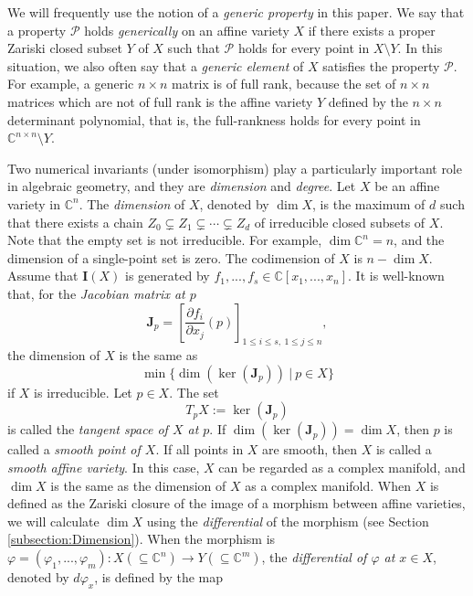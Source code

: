 \documentclass[reqno]{amsart}
\theoremstyle{definition}
\numberwithin{equation}{section}
\begin{document}
We will frequently use the notion of a \emph{generic property} in this paper. We say that a property $\mathcal{P}$ holds \emph{generically} on an affine variety $X$ if there exists a proper Zariski closed subset $Y$ of $X$ such that $\mathcal{P}$ holds for every point in $X \setminus Y$. In this situation, we also often say that a \emph{generic element} of $X$ satisfies the property $\mathcal{P}$. For example, a generic $n \times n$ matrix is of full rank, because the set of $n \times n$ matrices which are not of full rank is the affine variety $Y$ defined by the $n \times n$ determinant polynomial, that is, the full-rankness holds for every point in $\mathbb{C}^{n \times n} \setminus Y$.

Two numerical invariants (under isomorphism) play a particularly important role in algebraic geometry, and they are \emph{dimension} and \emph{degree}. Let $X$ be an affine variety in $\mathbb{C}^n$. The \emph{dimension} of $X$, denoted by $\dim X$, is the maximum of $d$ such that there exists a chain $Z_0 \subsetneq Z_1 \subsetneq \cdots \subsetneq Z_d$ of irreducible closed subsets of $X$. Note that the empty set is not irreducible. For example, $\dim \mathbb{C}^n=n$, and the dimension of a single-point set is zero. The codimension of $X$ is $n-\dim X$. Assume that $\mathbf{I}(X)$ is generated by $f_1,...,f_s \in \mathbb{C}[x_1,...,x_n]$. It is well-known that, for the \emph{Jacobian matrix at $p$}
\begin{equation*}
    \mathbf{J}_p=\left[\frac{\partial f_i}{\partial x_j}(p)\right]_{1 \leq i \leq s,~ 1 \leq j \leq n},
\end{equation*}
the dimension of $X$ is the same as
\begin{equation*}
    \min\{\dim(\ker(\mathbf{J}_p))~|~p \in X\}
\end{equation*}
if $X$ is irreducible. Let $p \in X$. The set
\begin{equation*}
    T_pX:=\ker(\mathbf{J}_p)
\end{equation*}
is called the \emph{tangent space of $X$ at $p$}. If $\dim (\ker(\mathbf{J}_p))=\dim X$, then $p$ is called a \emph{smooth point of $X$}. If all points in $X$ are smooth, then $X$ is called a \emph{smooth affine variety}. In this case, $X$ can be regarded as a complex manifold, and $\dim X$ is the same as the dimension of $X$ as a complex manifold. When $X$ is defined as the Zariski closure of the image of a morphism between affine varieties, we will calculate $\dim X$ using the \emph{differential} of the morphism (see Section \ref{subsection:Dimension}). When the morphism is $\varphi=(\varphi_1,...,\varphi_m):X (\subseteq \mathbb{C}^n) \rightarrow Y (\subseteq \mathbb{C}^m)$, the \emph{differential of $\varphi$ at $x \in X$}, denoted by $d\varphi_x$, is defined by the map 
\end{document}
